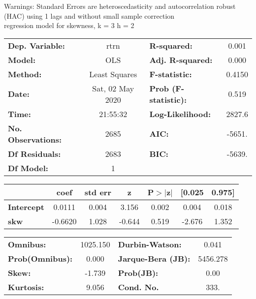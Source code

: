Warnings: \newline
 [1] Standard Errors are heteroscedasticity and autocorrelation robust (HAC) using 1 lags and without small sample correction\\ 

regression model for skewness, k = 3 h = 2\begin{center}
\begin{tabular}{lclc}
\toprule
\textbf{Dep. Variable:}    &       rtrn       & \textbf{  R-squared:         } &     0.001   \\
\textbf{Model:}            &       OLS        & \textbf{  Adj. R-squared:    } &     0.000   \\
\textbf{Method:}           &  Least Squares   & \textbf{  F-statistic:       } &    0.4150   \\
\textbf{Date:}             & Sat, 02 May 2020 & \textbf{  Prob (F-statistic):} &    0.519    \\
\textbf{Time:}             &     21:55:32     & \textbf{  Log-Likelihood:    } &    2827.6   \\
\textbf{No. Observations:} &        2685      & \textbf{  AIC:               } &    -5651.   \\
\textbf{Df Residuals:}     &        2683      & \textbf{  BIC:               } &    -5639.   \\
\textbf{Df Model:}         &           1      & \textbf{                     } &             \\
\bottomrule
\end{tabular}
\begin{tabular}{lcccccc}
                   & \textbf{coef} & \textbf{std err} & \textbf{z} & \textbf{P$> |$z$|$} & \textbf{[0.025} & \textbf{0.975]}  \\
\midrule
\textbf{Intercept} &       0.0111  &        0.004     &     3.156  &         0.002        &        0.004    &        0.018     \\
\textbf{skw}       &      -0.6620  &        1.028     &    -0.644  &         0.519        &       -2.676    &        1.352     \\
\bottomrule
\end{tabular}
\begin{tabular}{lclc}
\textbf{Omnibus:}       & 1025.150 & \textbf{  Durbin-Watson:     } &    0.041  \\
\textbf{Prob(Omnibus):} &   0.000  & \textbf{  Jarque-Bera (JB):  } & 5456.278  \\
\textbf{Skew:}          &  -1.739  & \textbf{  Prob(JB):          } &     0.00  \\
\textbf{Kurtosis:}      &   9.056  & \textbf{  Cond. No.          } &     333.  \\
\bottomrule
\end{tabular}
\end{center}

